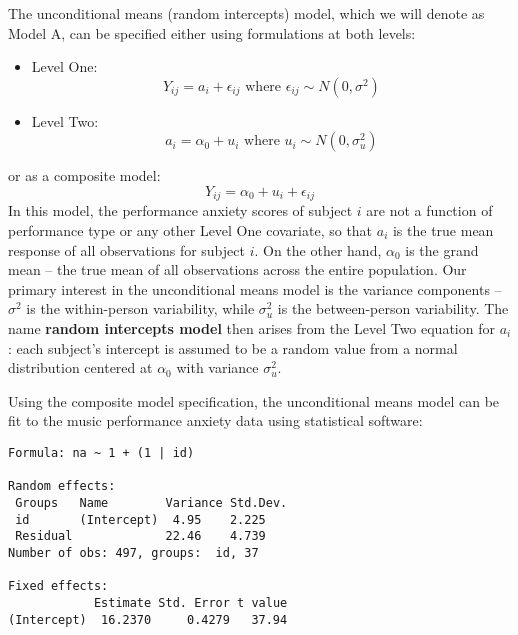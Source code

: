 \documentclass[
]{krantz}
\providecommand{\tightlist}{%
  \setlength{\itemsep}{0pt}\setlength{\parskip}{0pt}}
\begin{document}
The unconditional means (random intercepts) model, which we will denote as Model A, can be specified either using formulations at both levels:

\begin{itemize}
\tightlist
\item
  Level One:
  \begin{equation}
  Y_{ij} = a_{i}+\epsilon_{ij} \textrm{ where } \epsilon_{ij}\sim N(0,\sigma^2)
  \label{eq:level1uncmean}
  \end{equation}
\item
  Level Two:
  \begin{equation}
  a_{i} = \alpha_{0}+u_{i} \textrm{ where } u_{i}\sim N(0,\sigma_{u}^{2})
  \label{eq:level2uncmean}
  \end{equation}
\end{itemize}

or as a composite model:
\begin{equation}
Y_{ij}=\alpha_{0}+u_{i}+\epsilon_{ij}
\label{eq:compuncmean}
\end{equation}
In this model, the performance anxiety scores of subject \(i\) are not a function of performance type or any other Level One covariate, so that \(a_{i}\) is the true mean response of all observations for subject \(i\). On the other hand, \(\alpha_{0}\) is the grand mean -- the true mean of all observations across the entire population. Our primary interest in the unconditional means model is the variance components -- \(\sigma^2\) is the within-person variability, while \(\sigma_{u}^{2}\) is the between-person variability. The name \textbf{random intercepts model} then arises from the Level Two equation for \(a_{i}\): each subject's intercept is assumed to be a random value from a normal distribution centered at \(\alpha_{0}\) with variance \(\sigma_{u}^{2}\).

Using the composite model specification, the unconditional means model can be fit to the music performance anxiety data using statistical software:

\begin{verbatim}
Formula: na ~ 1 + (1 | id)

Random effects:
 Groups   Name        Variance Std.Dev.
 id       (Intercept)  4.95    2.225   
 Residual             22.46    4.739   
Number of obs: 497, groups:  id, 37

Fixed effects:
            Estimate Std. Error t value
(Intercept)  16.2370     0.4279   37.94
\end{verbatim}
\end{document}
